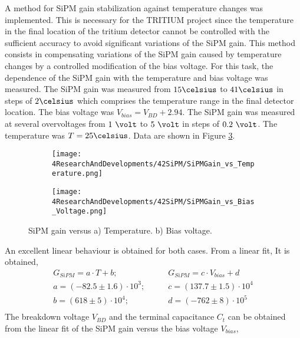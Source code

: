 A method for SiPM gain stabilization against temperature changes was implemented. This is necessary for the TRITIUM project since the temperature in the final location of the tritium detector cannot be controlled with the sufficient accuracy to avoid significant variations of the SiPM gain. This method consists in compensating variations of the SiPM gain caused by temperature changes by a controlled modification of the bias voltage. For this task, the dependence of the SiPM gain with the temperature and bias voltage was measured. The SiPM gain was measured from $15\celsius$ to $41\celsius$ in steps of $2\celsius$ which comprises the temperature range in the final detector location. The bias voltage was $V_{bias} = V_{BD}+2.94$. The SiPM gain was measured at several overvoltages from $1~\volt$ to $5~\volt$ in steps of $0.2~\volt$. The temperature was $T=25\celsius$. Data  are shown in Figure \ref{fig:SiPMGainDependance}.
\begin{figure}
\centering
    \begin{subfigure}[b]{0.9\textwidth}
    \centering
    \texttt{[image: 4ResearchAndDevelopments/42SiPM/SiPMGain\_vs\_Temperature.png]}  
    \caption{\label{subfig:SiPMGainvsTemperature}}
    \end{subfigure}
    \hfill
    \begin{subfigure}[b]{0.9\textwidth}
    \centering
    \texttt{[image: 4ResearchAndDevelopments/42SiPM/SiPMGain\_vs\_Bias\_Voltage.png]}  
    \caption{\label{subfig:SiPMGainvsBiasVoltage}}
    \end{subfigure}
 \caption{SiPM gain versus a) Temperature. b) Bias voltage.}
 \label{fig:SiPMGainDependance}
\end{figure}
An excellent linear behaviour is obtained for both cases. From a linear fit, It is obtained,
\begin{equation*}
\begin{split}
G_{SiPM}=a \cdot{} T + b;& \qquad G_{SiPM}=c \cdot{} V_{bias} + d\\
a=\left( -82.5 \pm 1.6 \right) \cdot{} 10^{3};& \qquad c=\left( 137.7 \pm 1.5 \right) \cdot{} 10^{4}\\
b=\left( 618 \pm 5 \right) \cdot{} 10^{4};& \qquad d=\left( -762 \pm 8 \right) \cdot{} 10^{5} \\
\label{SiPMGainVSTempV}
\end{split}
\end{equation*} 
The breakdown voltage $V_{BD}$ and the terminal capacitance $C_t$ can be obtained from the linear fit of the SiPM gain versus the bias voltage $V_{bias}$,

